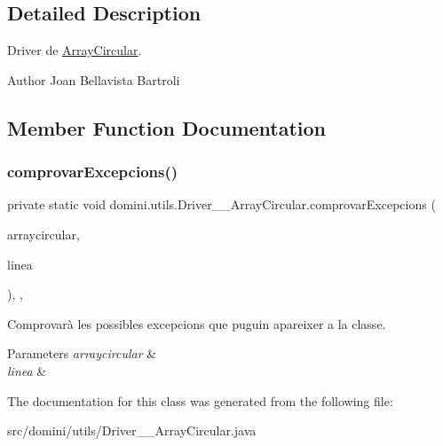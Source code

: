 \subsection{Detailed Description}
Driver de \hyperlink{classdomini_1_1utils_1_1ArrayCircular}{Array\+Circular}. 

\begin{DoxyAuthor}{Author}
Joan Bellavista Bartroli 
\end{DoxyAuthor}


\subsection{Member Function Documentation}
\mbox{\label{classdomini_1_1utils_1_1Driver____ArrayCircular_a0f5f42c5ace9176cfcae4dfe9717f380}} 
\subsubsection{\texorpdfstring{comprovar\+Excepcions()}{comprovarExcepcions()}}
{\footnotesize\ttfamily private static void domini.\+utils.\+Driver\+\_\+\+\_\+\+Array\+Circular.\+comprovar\+Excepcions (\begin{DoxyParamCaption}\item[{\hyperlink{classdomini_1_1utils_1_1ArrayCircular}{Array\+Circular}}]{arraycircular,  }\item[{String}]{linea }\end{DoxyParamCaption})\hspace{0.3cm}{\ttfamily [inline]}, {\ttfamily [static]}, {\ttfamily [private]}}



Comprovarà les possibles excepcions que puguin apareixer a la classe. 


\begin{DoxyParams}{Parameters}
{\em arraycircular} & \\
\hline
{\em linea} & \\
\hline
\end{DoxyParams}


The documentation for this class was generated from the following file\+:\begin{DoxyCompactItemize}
\item 
src/domini/utils/Driver\+\_\+\+\_\+\+Array\+Circular.\+java\end{DoxyCompactItemize}
